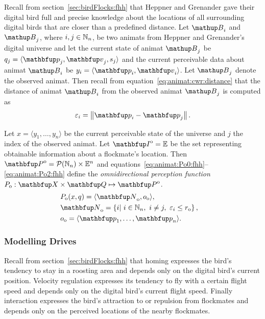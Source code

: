Recall from section~\ref{sec:birdFlocks:fhh} that Heppner and Grenander gave their digital bird full and precise knowledge about the locations of all surrounding digital birds that are closer than a predefined distance. Let $\autom{B}_i$ and $\autom{B}_j$, where $i, j \in \mathbb{N}_n$, be two animats from Heppner and Grenander's digital universe and let the current state of animat $\autom{B}_j$ be $q_j=\langle \vect{p}_j,\vect{v}_j,s_j \rangle$ and the current perceivable data about animat $\autom{B}_i$ be $y_i=\langle \vect{p}_i, \vect{v}_i \rangle$. Let $\autom{B}_j$ denote the observed animat. Then recall from equation~\eqref{eq:animat:cwr:distance} that the distance of animat $\autom{B}_i$ from the observed animat $\autom{B}_j$ is computed as
%
\begin{equation}
\varepsilon_i%
 =\left\|\vect{p}_i - \vect{p}_j\right\|. \nonumber
\end{equation}

\begin{definition}
\label{def:animat:Po:fhh}
Let $x=\langle y_1,\ldots,y_n\rangle$ be the current perceivable state of the universe and $j$ the index of the observed animat. Let $\set{I}^\textnormal{o}=\E$ be the set representing obtainable information about a flockmate's location. Then $\set{P}^\textnormal{o}=\powset{\N_n} \times \E^n$ and equations~\eqref{eq:animat:Po0:fhh}--\eqref{eq:animat:Po2:fhh} define the \emph{omnidirectional perception function} $P_\textnormal{o}: \set{X} \times \set{Q} \mapsto \set{P}^\textnormal{o}$.
\begin{eqnarray}
& P_\textnormal{o}(x,q)=\langle\set{N}_\textnormal{o},o_\textnormal{o}\rangle, & \label{eq:animat:Po0:fhh} \\
& \set{N}_\textnormal{o}=\left\{i|\ i \in \N_n,\ i \neq j,\ \varepsilon_i \leq r_\textnormal{o} \right\}, & \\ 
& o_\textnormal{o}=\langle \vect{p}_1,\ldots,\vect{p}_n\rangle. & \label{eq:animat:Po2:fhh}
\end{eqnarray}
\end{definition}

\subsubsection{Modelling Drives}
Recall from section~\ref{sec:birdFlocks:fhh} that homing expresses the bird's tendency to stay in a roosting area and depends only on the digital bird's current position. Velocity regulation expresses its tendency to fly with a certain flight speed and depends only on the digital bird's current flight speed. Finally interaction expresses the bird's attraction to or repulsion from flockmates and depends only on the perceived locations of the nearby flockmates. 

